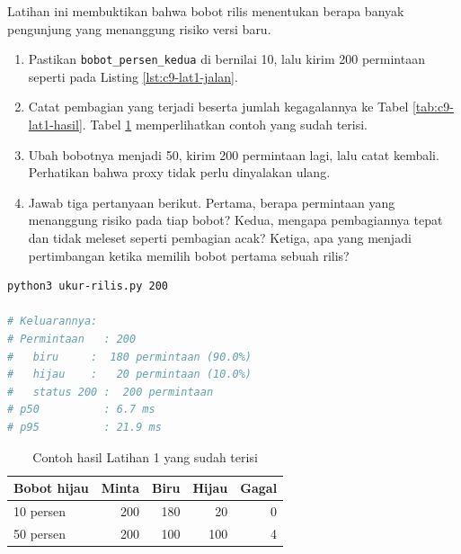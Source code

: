 Latihan ini membuktikan bahwa bobot rilis menentukan berapa banyak pengunjung
yang menanggung risiko versi baru.

\begin{enumerate}
  \item Pastikan \texttt{bobot\_persen\_kedua} di
         bernilai 10, lalu kirim 200
        permintaan seperti pada Listing \ref{lst:c9-lat1-jalan}.
  \item Catat pembagian yang terjadi beserta jumlah kegagalannya ke Tabel \ref{tab:c9-lat1-hasil}. Tabel \ref{tab:c9-lat1-contoh}
        memperlihatkan contoh yang sudah terisi.
  \item Ubah bobotnya menjadi 50, kirim 200 permintaan lagi, lalu catat
        kembali. Perhatikan bahwa proxy tidak perlu dinyalakan ulang.
  \item Jawab tiga pertanyaan berikut. Pertama, berapa permintaan yang
        menanggung risiko pada tiap bobot? Kedua, mengapa pembagiannya tepat
        dan tidak meleset seperti pembagian acak? Ketiga, apa yang menjadi
        pertimbangan ketika memilih bobot pertama sebuah rilis?
\end{enumerate}

\begin{lstlisting}[language=bash, caption={Mengukur pembagian rilis, tersedia di \berkas{sources/chapter09/ukur-rilis.py}}, label={lst:c9-lat1-jalan}]
python3 ukur-rilis.py 200

# Keluarannya:
# Permintaan   : 200
#   biru     :  180 permintaan (90.0%)
#   hijau    :   20 permintaan (10.0%)
#   status 200 :  200 permintaan
# p50          : 6.7 ms
# p95          : 21.9 ms
\end{lstlisting}

\begin{table}[!htb]
  \centering
  \caption{Contoh hasil Latihan 1 yang sudah terisi}
  \label{tab:c9-lat1-contoh}
  \begin{tabularx}{\textwidth}{Xrrrr}
    \hline
    \textbf{Bobot hijau} & \textbf{Minta} & \textbf{Biru} & \textbf{Hijau} & \textbf{Gagal} \\
    \hline
    10 persen & 200 & 180 & 20 & 0 \\
    \hline
    50 persen & 200 & 100 & 100 & 4 \\
    \hline
  \end{tabularx}
\end{table}

